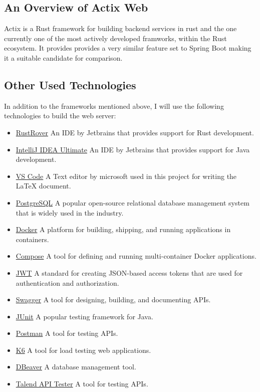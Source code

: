 \documentclass[a4paper,12pt]{article}
\begin{document}
	\subsection{An Overview of Actix Web}
	\label{subsec:actix_web}
	Actix is a Rust framework for building backend services in rust and the one currently one of the most actively developed framworks,
	within the Rust ecosystem. It provides provides a very similar feature set to Spring Boot making it a suitable candidate for comparison.

	\newpage
	\subsection{Other Used Technologies}
	\label{subsec:used_technologies}
	In addition to the frameworks mentioned above, I will use the following technologies to build the web server:
	\begin{itemize}
		\item \href{https://www.jetbrains.com/de-de/rust/}{RustRover} An IDE by Jetbrains that provides support for Rust development.
		\item \href{https://www.jetbrains.com/de-de/idea/}{IntelliJ IDEA Ultimate} An IDE by Jetbrains that provides support for Java development.
		\item \href{https://code.visualstudio.com/}{VS Code} A Text editor by microsoft used in this project for writing the LaTeX document.
		\item \href{https://www.postgresql.org/}{PostgreSQL} A popular open-source relational database management system that is widely used in the industry.
		\item \href{https://www.docker.com/}{Docker} A platform for building, shipping, and running applications in containers.
		\item \href{https://docs.docker.com/compose/}{Compose} A tool for defining and running multi-container Docker applications.
		\item \href{https://jwt.io/}{JWT} A standard for creating JSON-based access tokens that are used for authentication and authorization.
		\item \href{https://swagger.io/}{Swagger}  A tool for designing, building, and documenting APIs.
		\item \href{https://junit.org/junit5/}{JUnit} A popular testing framework for Java.
		\item \href{https://www.postman.com/}{Postman} A tool for testing APIs.
		\item \href{https://k6.io/}{K6} A tool for load testing web applications.
		\item \href{https://dbeaver.io/}{DBeaver} A database management tool.
		\item \href{https://chromewebstore.google.com/detail/talend-api-tester-free-ed/aejoelaoggembcahagimdiliamlcdmfm}{Talend API Tester} A tool for testing APIs.
	\end{itemize}
\end{document}
